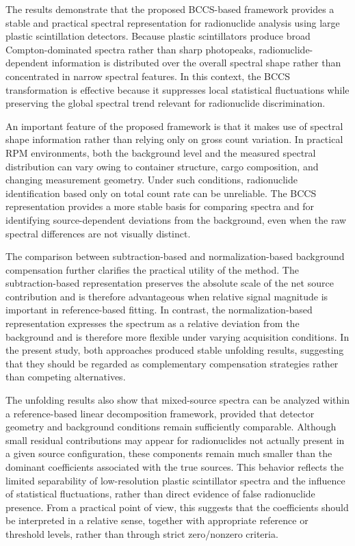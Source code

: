 \documentclass[10pt]{wlscirep}
\begin{document}
\color{blue}
The results demonstrate that the proposed BCCS-based framework provides a stable and practical spectral representation for radionuclide analysis using large plastic scintillation detectors. Because plastic scintillators produce broad Compton-dominated spectra rather than sharp photopeaks, radionuclide-dependent information is distributed over the overall spectral shape rather than concentrated in narrow spectral features. In this context, the BCCS transformation is effective because it suppresses local statistical fluctuations while preserving the global spectral trend relevant for radionuclide discrimination.

An important feature of the proposed framework is that it makes use of spectral shape information rather than relying only on gross count variation. In practical RPM environments, both the background level and the measured spectral distribution can vary owing to container structure, cargo composition, and changing measurement geometry. Under such conditions, radionuclide identification based only on total count rate can be unreliable. The BCCS representation provides a more stable basis for comparing spectra and for identifying source-dependent deviations from the background, even when the raw spectral differences are not visually distinct.

The comparison between subtraction-based and normalization-based background compensation further clarifies the practical utility of the method. The subtraction-based representation preserves the absolute scale of the net source contribution and is therefore advantageous when relative signal magnitude is important in reference-based fitting. In contrast, the normalization-based representation expresses the spectrum as a relative deviation from the background and is therefore more flexible under varying acquisition conditions. In the present study, both approaches produced stable unfolding results, suggesting that they should be regarded as complementary compensation strategies rather than competing alternatives.

The unfolding results also show that mixed-source spectra can be analyzed within a reference-based linear decomposition framework, provided that detector geometry and background conditions remain sufficiently comparable. Although small residual contributions may appear for radionuclides not actually present in a given source configuration, these components remain much smaller than the dominant coefficients associated with the true sources. This behavior reflects the limited separability of low-resolution plastic scintillator spectra and the influence of statistical fluctuations, rather than direct evidence of false radionuclide presence. From a practical point of view, this suggests that the coefficients should be interpreted in a relative sense, together with appropriate reference or threshold levels, rather than through strict zero/nonzero criteria.
\end{document}
